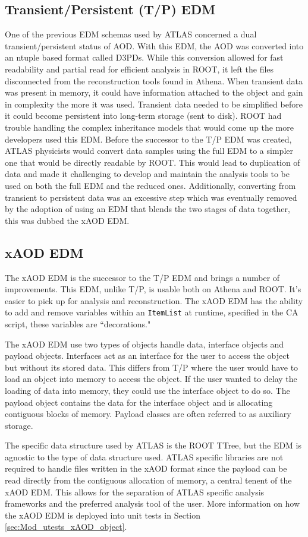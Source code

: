 \subsection{Transient/Persistent (T/P) EDM}
One of the previous EDM schemas used by ATLAS concerned a dual transient/persistent status of AOD.
With this EDM, the AOD was converted into an ntuple based format called D3PDs. 
While this conversion allowed for fast readability and partial read for efficient analysis in ROOT, it left the files disconnected from the reconstruction tools found in Athena.\cite{Athena_xAOD_design}
When transient data was present in memory, it could have information attached to the object and gain in complexity the more it was used.
Transient data needed to be simplified before it could become persistent into long-term storage (sent to disk). 
ROOT had trouble handling the complex inheritance models that would come up the more developers used this EDM. 
Before the successor to the T/P EDM was created, ATLAS physicists would convert data samples using the full EDM to a simpler one that would be directly readable by ROOT.
This would lead to duplication of data and made it challenging to develop and maintain the analysis tools to be used on both the full EDM and the reduced ones.
Additionally, converting from transient to persistent data was an excessive step which was eventually removed by the adoption of using an EDM that blends the two stages of data together, this was dubbed the xAOD EDM.




\subsection{xAOD EDM}
The xAOD EDM is the successor to the T/P EDM and brings a number of improvements.
This EDM, unlike T/P, is usable both on Athena and ROOT.
It's easier to pick up for analysis and reconstruction. 
The xAOD EDM has the ability to add and remove variables within an \verb|ItemList| at runtime, specified in the CA script, these variables are ``decorations."

The xAOD EDM use two types of objects handle data, interface objects and payload objects. 
Interfaces act as an interface for the user to access the object but without its stored data. 
This differs from T/P where the user would have to load an object into memory to access the object. 
If the user wanted to delay the loading of data into memory, they could use the interface object to do so. 
The payload object contains the data for the interface object and is allocating contiguous blocks of memory. 
Payload classes are often referred to as auxiliary storage. 

The specific data structure used by ATLAS is the ROOT TTree, but the EDM is agnostic to the type of data structure used. 
ATLAS specific libraries are not required to handle files written in the xAOD format since the payload can be read directly from the contiguous allocation of memory, a central tenent of the xAOD EDM.
This allows for the separation of ATLAS specific analysis frameworks and the preferred analysis tool of the user.
More information on how the xAOD EDM is deployed into unit tests in Section \ref{sec:Mod_utests_xAOD_object}.

